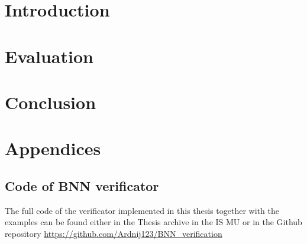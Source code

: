 \documentclass[
    digital,
    color,
    oneside,
    sansbold,
    lot,
    nolof
]{fithesis4}
\begin{document}

\chapter{Introduction}





\chapter{Evaluation}

\chapter{Conclusion}

\chapter*{Appendices}

\section*{Code of BNN verificator}
The full code of the verificator implemented in this thesis together with
the examples can be found either in the Thesis archive in the IS MU
or in the Github repository \href{https://github.com/Ardnij123/BNN_verification}{https://github.com/Ardnij123/BNN\_verification}
\end{document}
